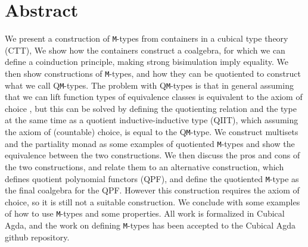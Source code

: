 \documentclass[twoside,11pt,openright]{report}
\theoremstyle{plain} %
\theoremstyle{definition}
\theoremstyle{remark}
\begin{document}

\pagestyle{empty} 
\vspace*{\fill}
\clearpage


\pagestyle{plain}
\chapter*{Abstract}

We present a construction of \texttt{M}-types from containers in a cubical type theory (CTT), We show how the containers construct a coalgebra, for which we can define a coinduction principle, making strong bisimulation imply equality. We then show constructions of \texttt{M}-types, and how they can be quotiented to construct what we call Q\texttt{M}-types. The problem with Q\texttt{M}-types is that in general assuming that we can lift function types of equivalence classes is equivalent to the axiom of choice \cite{DBLP:tt-in-tt}, but this can be solved by defining the quotienting relation and the type at the same time as a quotient inductive-inductive type (QIIT), which assuming the axiom of (countable) choice, is equal to the Q\texttt{M}-type. We construct multisets and the partiality monad as some examples of quotiented \texttt{M}-types and show the equivalence between the two constructions. We then discuss the pros and cons of the two constructions, and relate them to an alternative construction, which defines quotient polynomial functors (QPF), and define the quotiented \texttt{M}-type as the final coalgebra for the QPF. However this construction requires the axiom of choice, so it is still not a suitable construction. We conclude with some examples of how to use \texttt{M}-types and some properties. All work is formalized in Cubical Agda, and the work on defining \texttt{M}-types has been accepted to the Cubical Agda github repository. 
\end{document}
